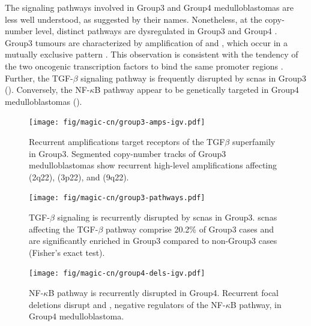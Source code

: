 \clearpage

The signaling pathways involved in Group3 and Group4 medulloblastomas are less well understood, as suggested by their names. Nonetheless, at the copy-number level, distinct pathways are dysregulated in Group3 and Group4 . Group3 tumours are characterized by amplification of  and , which occur in a mutually exclusive pattern . This observation is consistent with the tendency of the two oncogenic transcription factors to bind the same promoter regions . Further, the TGF-$\beta$ signaling pathway is frequently disrupted by \gls{scnas} in Group3 (). Conversely, the NF-$\kappa$B pathway appear to be genetically targeted in Group4 medulloblastomas ().

\begin{figure}
	\centering
	\texttt{[image: fig/magic-cn/group3-amps-igv.pdf]}
	\caption[Recurrent amplifications target receptors of the TGF$\beta$ superfamily in Group3]
	{
		Recurrent amplifications target receptors of the TGF$\beta$ superfamily in Group3.
		Segmented copy-number tracks of Group3 medulloblastomas show recurrent high-level amplifications affecting  (2q22),  (3p22), and  (9q22).
	}
	\label{fig:group3-amps-igv}
\end{figure}

\begin{figure}
	\centering
	\texttt{[image: fig/magic-cn/group3-pathways.pdf]}
	\caption[TGF-$\beta$ signaling is recurrently disrupted by \gls{scnas} in Group3]
	{
		TGF-$\beta$ signaling is recurrently disrupted by \gls{scnas} in Group3.
		\gls{scnas} affecting the TGF-$\beta$ pathway comprise 20.2\% of Group3 cases and are significantly enriched in Group3 compared to non-Group3 cases (Fisher's exact test).
	}
	\label{fig:group3-pathways}
\end{figure}

\begin{figure}
	\centering
	\texttt{[image: fig/magic-cn/group4-dels-igv.pdf]}
	\caption[NF-$\kappa$B pathway is recurrently disrupted in Group4]
	{
	NF-$\kappa$B pathway is recurrently disrupted in Group4.
	Recurrent focal deletions disrupt  and , negative regulators of the NF-$\kappa$B pathway, in Group4 medulloblastoma.
	}
	\label{fig:group4-dels-igv}
\end{figure}

